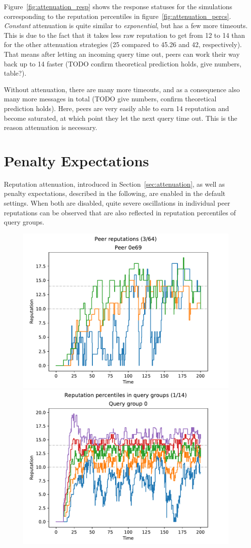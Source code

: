 Figure~\ref{fig:attenuation_resp} shows the response statuses for the
simulations corresponding to the reputation percentiles in
figure~\ref{fig:attenuation_percs}. \emph{Constant} attenuation is quite similar
to \emph{exponential}, but has a few more timeouts. This is due to the fact that
it takes less raw reputation to get from 12 to 14 than for the other attenuation
strategies (25 compared to 45.26 and 42, respectively). That means after letting
an incoming query time out, peers can work their way back up to 14 faster (TODO
confirm theoretical prediction holds, give numbers, table?).

Without attenuation, there are many more timeouts, and as a consequence also
many more messages in total (TODO give numbers, confirm theoretical prediction
holds). Here, peers are very easily able to earn 14 reputation and become
saturated, at which point they let the next query time out. This is the reason
attenuation is necessary.

\section{Penalty Expectations}
\label{sec:penalty_expectations}
Reputation attenuation, introduced in Section~\ref{sec:attenuation}, as well as
penalty expectations, described in the following, are enabled in the default
settings. When both are disabled, quite severe oscillations in individual peer
reputations can be observed that are also reflected in reputation percentiles of
query groups.

\begin{figure}[t]
\centering
\includegraphics[width=0.5\columnwidth]{figures/expectations_off_no_att_peer_reps_3_of_64}%
\includegraphics[width=0.5\columnwidth]{figures/expectations_off_no_att_rep_percs_1_of_14}
\label{fig:penalty_expectations_off_no_att_peer_reps_percs}
\end{figure}

